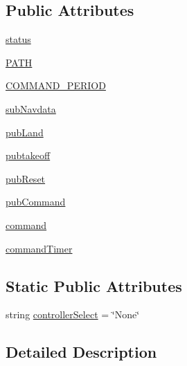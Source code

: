 \subsection*{Public Attributes}
\begin{DoxyCompactItemize}
\item 
\hyperlink{classbasicdronecontroller_1_1basicDroneController_a18e9a784471aeea334924200a3436ea0}{status}
\item 
\hyperlink{classbasicdronecontroller_1_1basicDroneController_adf8d9672e3056c0d4efe910a88d21aa6}{P\-A\-T\-H}
\item 
\hyperlink{classbasicdronecontroller_1_1basicDroneController_a29958b85ade2a93b5c860430147e9899}{C\-O\-M\-M\-A\-N\-D\-\_\-\-P\-E\-R\-I\-O\-D}
\item 
\hyperlink{classbasicdronecontroller_1_1basicDroneController_a182cc9c8459937f8db8ff30f666234b9}{sub\-Navdata}
\item 
\hyperlink{classbasicdronecontroller_1_1basicDroneController_aa26852e9bc4b9a8a78639a7973a0037f}{pub\-Land}
\item 
\hyperlink{classbasicdronecontroller_1_1basicDroneController_a65bf2f7ffe2d7408d865e4b3cdc6bbdf}{pubtakeoff}
\item 
\hyperlink{classbasicdronecontroller_1_1basicDroneController_ab960a8784bab6e3c99204893f2a4a910}{pub\-Reset}
\item 
\hyperlink{classbasicdronecontroller_1_1basicDroneController_ad6b79da799e584a1d6f06e472f06fab2}{pub\-Command}
\item 
\hyperlink{classbasicdronecontroller_1_1basicDroneController_a61307b396db405d7a75e9ac310abc1c9}{command}
\item 
\hyperlink{classbasicdronecontroller_1_1basicDroneController_aec39e95fe93747f72ac864717480dcb4}{command\-Timer}
\end{DoxyCompactItemize}
\subsection*{Static Public Attributes}
\begin{DoxyCompactItemize}
\item 
string \hyperlink{classbasicdronecontroller_1_1basicDroneController_ae6fe1e6547cc0b52d85acbdea802a915}{controller\-Select} = \char`\"{}None\char`\"{}
\end{DoxyCompactItemize}


\subsection{Detailed Description}



